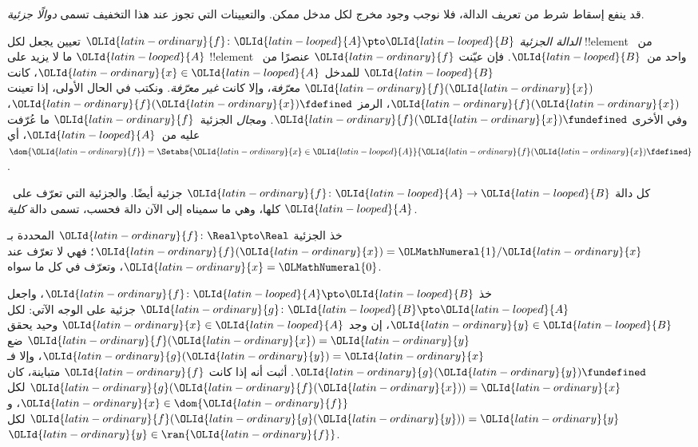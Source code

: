 \documentclass[../../../include/open-logic-section]{subfiles}
\begin{document}


\begin{explain}
قد ينفع إسقاط شرط من تعريف الدالة، فلا نوجب وجود مخرج لكل مدخل
ممكن. والتعيينات التي تجوز عند هذا التخفيف تسمى \emph{دوالًا جزئية}.
\end{explain}

\begin{defn}
\emph{الدالة الجزئية} $\OLId{latin-ordinary}{f} \colon \OLId{latin-looped}{A} \pto \OLId{latin-looped}{B}$ تعيين يجعل لكل
!!{element} من~$\OLId{latin-looped}{A}$ ما لا يزيد على !!{element} واحد من~$\OLId{latin-looped}{B}$.
فإن عيّنت $\OLId{latin-ordinary}{f}$ عنصرًا من~$\OLId{latin-looped}{B}$ للمدخل $\OLId{latin-ordinary}{x} \in \OLId{latin-looped}{A}$، كانت $\OLId{latin-ordinary}{f}(\OLId{latin-ordinary}{x})$
\emph{معرّفة}، وإلا كانت \emph{غير معرّفة}. ونكتب في الحال الأولى،
إذا تعينت $\OLId{latin-ordinary}{f}(\OLId{latin-ordinary}{x})$، الرمز $\OLId{latin-ordinary}{f}(\OLId{latin-ordinary}{x}) \fdefined$، وفي الأخرى $\OLId{latin-ordinary}{f}(\OLId{latin-ordinary}{x}) \fundefined$.
و\emph{مجال} الجزئية~$\OLId{latin-ordinary}{f}$ ما عُرّفت عليه من~$\OLId{latin-looped}{A}$، أي
$\dom{\OLId{latin-ordinary}{f}} = \Setabs{\OLId{latin-ordinary}{x} \in \OLId{latin-looped}{A}}{\OLId{latin-ordinary}{f}(\OLId{latin-ordinary}{x}) \fdefined}$.
\end{defn}

\begin{ex}
كل دالة $\OLId{latin-ordinary}{f}\colon \OLId{latin-looped}{A} \to \OLId{latin-looped}{B}$ جزئية أيضًا. والجزئية التي تعرّف على~$\OLId{latin-looped}{A}$
كلها، وهي ما سميناه إلى الآن دالة فحسب، تسمى دالة \emph{كلية}.
\end{ex}

\begin{ex}
خذ الجزئية $\OLId{latin-ordinary}{f} \colon \Real \pto \Real$ المحددة بـ$\OLId{latin-ordinary}{f}(\OLId{latin-ordinary}{x}) = \OLMathNumeral{1}/\OLId{latin-ordinary}{x}$؛
فهي لا تعرّف عند $\OLId{latin-ordinary}{x} = \OLMathNumeral{0}$، وتعرّف في كل ما سواه.
\end{ex}

\begin{prob}
خذ $\OLId{latin-ordinary}{f}\colon \OLId{latin-looped}{A} \pto \OLId{latin-looped}{B}$، واجعل $\OLId{latin-ordinary}{g}\colon \OLId{latin-looped}{B} \pto \OLId{latin-looped}{A}$ جزئية على الوجه
الآتي: لكل $\OLId{latin-ordinary}{y} \in \OLId{latin-looped}{B}$، إن وجد $\OLId{latin-ordinary}{x} \in \OLId{latin-looped}{A}$ وحيد يحقق $\OLId{latin-ordinary}{f}(\OLId{latin-ordinary}{x}) = \OLId{latin-ordinary}{y}$
ضع $\OLId{latin-ordinary}{g}(\OLId{latin-ordinary}{y}) = \OLId{latin-ordinary}{x}$، وإلا فـ$\OLId{latin-ordinary}{g}(\OLId{latin-ordinary}{y}) \fundefined$. أثبت أنه إذا كانت
$\OLId{latin-ordinary}{f}$ متباينة، كان $\OLId{latin-ordinary}{g}(\OLId{latin-ordinary}{f}(\OLId{latin-ordinary}{x})) = \OLId{latin-ordinary}{x}$ لكل $\OLId{latin-ordinary}{x} \in \dom{\OLId{latin-ordinary}{f}}$،
و$\OLId{latin-ordinary}{f}(\OLId{latin-ordinary}{g}(\OLId{latin-ordinary}{y})) = \OLId{latin-ordinary}{y}$ لكل $\OLId{latin-ordinary}{y} \in \ran{\OLId{latin-ordinary}{f}}$.
\end{prob}
\end{document}
